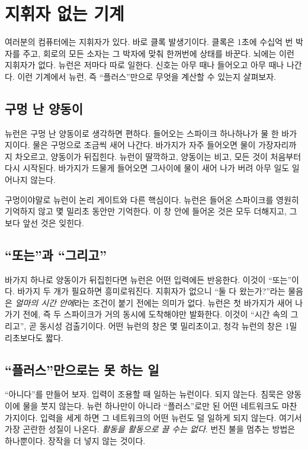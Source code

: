 \chapter{지휘자 없는 기계}

여러분의 컴퓨터에는 지휘자가 있다. 바로 클록 발생기이다. 클록은 1초에 수십억 번 박자를 주고, 회로의 모든 소자는 그 박자에 맞춰 한꺼번에 상태를 바꾼다. 뇌에는 이런 지휘자가 없다. 뉴런은 저마다 따로 일한다. 신호는 아무 때나 들어오고 아무 때나 나간다. 이런 기계에서  뉴런, 즉 “플러스”만으로 무엇을 계산할 수 있는지 살펴보자.

\section*{구멍 난 양동이}

뉴런은 구멍 난 양동이로 생각하면 편하다. 들어오는 스파이크 하나하나가 물 한 바가지이다. 물은 구멍으로 조금씩 새어 나간다. 바가지가 자주 들어오면 물이 가장자리까지 차오르고, 양동이가 뒤집힌다. 뉴런이 딸깍하고, 양동이는 비고, 모든 것이 처음부터 다시 시작된다. 바가지가 드물게 들어오면 그사이에 물이 새어 나가 버려 아무 일도 일어나지 않는다.


구멍이야말로 뉴런이 논리 게이트와 다른 핵심이다. 뉴런은 들어온 스파이크를 영원히 기억하지 않고 몇 밀리초 동안만 기억한다. 이 창 안에 들어온 것은 모두 더해지고, 그보다 앞선 것은 잊힌다.

\section*{“또는”과 “그리고”}

바가지 하나로 양동이가 뒤집힌다면 뉴런은 어떤 입력에든 반응한다. 이것이 “또는”이다. 바가지 두 개가 필요하면 흥미로워진다. 지휘자가 없으니 “둘 다 왔는가?”라는 물음은 \emph{얼마의 시간 안에}라는 조건이 붙기 전에는 의미가 없다. 뉴런은 첫 바가지가 새어 나가기 전에, 즉 두 스파이크가 거의 동시에 도착해야만 발화한다. 이것이 “시간 속의 그리고”, 곧 동시성 검출기이다. 어떤 뉴런의 창은 몇 밀리초이고, 청각 뉴런의 창은 1밀리초보다도 짧다.

\section*{“플러스”만으로는 못 하는 일}

“아니다”를 만들어 보자. 입력이 조용할 때 일하는 뉴런이다. 되지 않는다. 침묵은 양동이에 물을 붓지 않는다. 뉴런 하나만이 아니라 “플러스”로만 된 어떤 네트워크도 마찬가지이다. 입력을 세게 하면 그 네트워크의 어떤 뉴런도 덜 일하게 되지 않는다. 여기서 가장 곤란한 성질이 나온다. \emph{활동을 활동으로 끌 수는 없다}. 번진 불을 멈추는 방법은 하나뿐이다. 장작을 더 넣지 않는 것이다.


